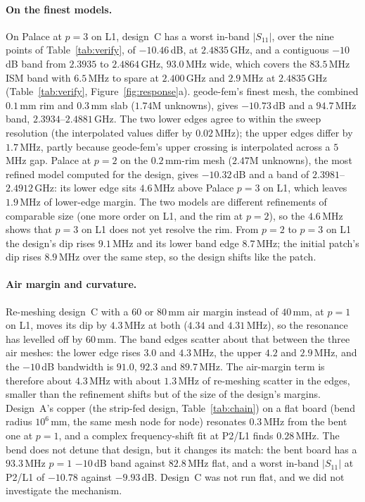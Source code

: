 \documentclass{anvil-paper}
\newcommand{\PL}{P2/L1}
\begin{document}
\paragraph{On the finest models.}
On Palace at $p = 3$ on L1, design~C has a worst in-band $|S_{11}|$, over the
nine points of Table~\ref{tab:verify}, of $-10.46$\,dB, at $2.4835$\,GHz, and a contiguous $-10$\,dB band from
$2.3935$ to $2.4864$\,GHz, $93.0$\,MHz wide, which covers the $83.5$\,MHz ISM
band with $6.5$\,MHz to spare at $2.400$\,GHz and $2.9$\,MHz at $2.4835$\,GHz
(Table~\ref{tab:verify}, Figure~\ref{fig:response}a). geode-fem's finest
mesh, the combined $0.1$\,mm rim and $0.3$\,mm slab ($1.74$M unknowns),
gives $-10.73$\,dB and a $94.7$\,MHz band, $2.3934$--$2.4881$\,GHz. The two
lower edges agree to within the sweep resolution (the interpolated values
differ by $0.02$\,MHz); the upper edges differ by $1.7$\,MHz, partly
because geode-fem's upper crossing is interpolated across a $5$\,MHz gap. Palace at $p = 2$ on the $0.2$\,mm-rim mesh ($2.47$M unknowns), the
most refined model computed for the design, gives $-10.32$\,dB and a band
of $2.3981$--$2.4912$\,GHz: its lower edge sits $4.6$\,MHz above Palace
$p = 3$ on L1, which leaves $1.9$\,MHz of lower-edge margin. The two models
are different refinements of comparable size (one more order on L1, and the
rim at $p = 2$), so the $4.6$\,MHz shows that $p = 3$ on L1 does not yet
resolve the rim. From $p = 2$ to $p = 3$ on L1 the design's dip rises
$9.1$\,MHz and its lower band edge $8.7$\,MHz; the initial patch's dip rises
$8.9$\,MHz over the same step, so the design shifts like the patch.

\paragraph{Air margin and curvature.}
Re-meshing design~C with a $60$ or $80$\,mm air margin
instead of $40$\,mm, at $p = 1$ on L1, moves its dip by $4.3$\,MHz at both
($4.34$ and $4.31$\,MHz), so the resonance has levelled off by $60$\,mm. The
band edges scatter about that between the three air meshes: the lower edge
rises $3.0$ and $4.3$\,MHz, the upper $4.2$ and $2.9$\,MHz, and the $-10$\,dB
bandwidth is $91.0$, $92.3$ and $89.7$\,MHz. The air-margin term is therefore
about $4.3$\,MHz with about $1.3$\,MHz of re-meshing scatter in the edges,
smaller than the refinement shifts but of the size of the design's margins.
Design~A's copper (the strip-fed design, Table~\ref{tab:chain}) on
a flat board (bend radius $10^6$\,mm, the same mesh node for node)
resonates $0.3$\,MHz from the bent one at $p = 1$, and a complex
frequency-shift fit at \PL{} finds $0.28$\,MHz. The bend does not detune
that design, but it changes its match: the bent board has a $93.3$\,MHz
$p = 1$ $-10$\,dB band against $82.8$\,MHz flat, and a worst in-band
$|S_{11}|$ at \PL{} of $-10.78$ against $-9.93$\,dB. Design~C was not run
flat, and we did not investigate the mechanism.
\end{document}
